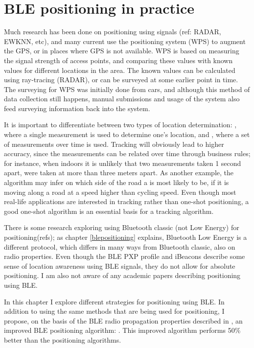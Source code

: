 \chapter{BLE positioning in practice}
\label{chap:architecture}


Much research has been done on positioning using \wifi signals (ref: RADAR, EWKNN, etc), and many current \devices use the \wifi positioning system (WPS) to augment the GPS, or in places where GPS is not available.
WPS is based on measuring the signal strength of access points, and comparing these values with known values for different locations in the area.
The known values can be calculated using ray-tracing (RADAR), or can be surveyed at some earlier point in time.
The surveying for WPS was initially done from cars, and although this method of data collection still happens, manual submissions and usage of the system also feed surveying information back into the system.

It is important to differentiate between two types of location determination: , where a single measurement is used to determine one's location, and , where a set of measurements over time is used.
Tracking will obviously lead to higher accuracy, since the measurements can be related over time through business rules; for instance, when indoors it is unlikely that two measurements taken 1 second apart, were taken at more than three meters apart.
As another example, the algorithm may infer on which side of the road a \device is most likely to be, if it is moving along a road at a speed higher than cycling speed.
Even though most real-life applications are interested in tracking rather than one-shot positioning, a good one-shot algorithm is an essential basis for a tracking algorithm.

There is some research exploring using Bluetooth classic (not Low Energy) for positioning(refs); as chapter \ref{blepositioning} explains, Bluetooth Low Energy is a different protocol, which differs in many ways from Bluetooth classic, also on radio properties.
Even though the BLE PXP profile and iBeacons describe some sense of location awareness using BLE signals, they do not allow for absolute positioning.
I am also not aware of any academic papers describing positioning using BLE.

In this chapter I explore different strategies for positioning using BLE.
In addition to using the same methods that are being used for \wifi positioning, I propose, on the basis of the BLE radio propagation properties described in , an improved BLE positioning algorithm: \BRP.
This improved algorithm performs 50\% better than the \wifi positioning algorithms.

